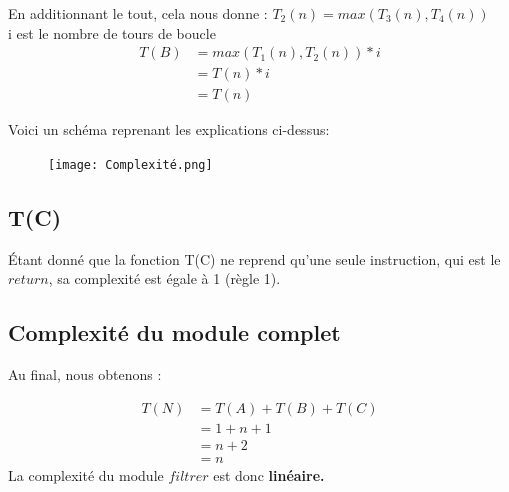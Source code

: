 \documentclass[a4paper, 11pt, oneside]{article}
\begin{document}
En additionnant le tout, cela nous donne : 
$T_2(n) =  max(T_3(n), T_4(n))$
\\i est le nombre de tours de boucle
\begin{align}
  T(B) &= max(T_1(n), T_2(n)) * i\nonumber \\
       &= T(n) * i  \nonumber \\
       &=T(n) \nonumber
\end{align}

Voici un schéma reprenant les explications ci-dessus:
\\
\begin{figure}
\centering \texttt{[image: Complexité.png]}
\end{figure}

\subsection{T(C)}

Étant donné que la fonction T(C) ne reprend qu'une seule instruction, qui est le $return$, sa complexité est égale à 1 (règle 1).

\subsection{Complexité du module complet}

Au final, nous obtenons :

\begin{align}
  T(N) &= T(A) + T(B) + T(C) \nonumber \\
       &= 1 + n + 1 \nonumber \\
       &= n + 2 \nonumber \\
       &= n
\end{align}
La complexité du module $filtrer$ est donc \bf linéaire.
\end{document}
